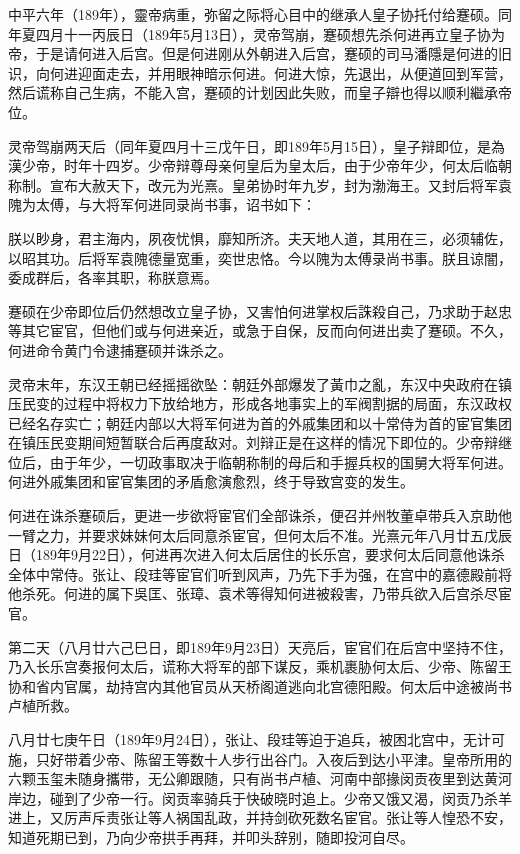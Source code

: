 中平六年（189年），靈帝病重，弥留之际将心目中的继承人皇子协托付给蹇硕。同年夏四月十一丙辰日（189年5月13日），灵帝驾崩，蹇硕想先杀何进再立皇子协为帝，于是请何进入后宫。但是何进刚从外朝进入后宫，蹇硕的司马潘隱是何进的旧识，向何进迎面走去，并用眼神暗示何进。何进大惊，先退出，从便道回到军营，然后谎称自己生病，不能入宫，蹇硕的计划因此失败，而皇子辯也得以顺利繼承帝位。

灵帝驾崩两天后（同年夏四月十三戊午日，即189年5月15日），皇子辩即位，是為漢少帝，时年十四岁。少帝辩尊母亲何皇后为皇太后，由于少帝年少，何太后临朝称制。宣布大赦天下，改元为光熹。皇弟协时年九岁，封为渤海王。又封后将军袁隗为太傅，与大将军何进同录尚书事，诏书如下：

朕以眇身，君主海内，夙夜忧惧，靡知所济。夫天地人道，其用在三，必须辅佐，以昭其功。后将军袁隗德量宽重，奕世忠恪。今以隗为太傅录尚书事。朕且谅闇，委成群后，各率其职，称朕意焉。

蹇硕在少帝即位后仍然想改立皇子协，又害怕何进掌权后誅殺自己，乃求助于赵忠等其它宦官，但他们或与何进亲近，或急于自保，反而向何进出卖了蹇硕。不久，何进命令黄门令逮捕蹇硕并诛杀之。

灵帝末年，东汉王朝已经摇摇欲坠：朝廷外部爆发了黃巾之亂，东汉中央政府在镇压民变的过程中将权力下放给地方，形成各地事实上的军阀割据的局面，东汉政权已经名存实亡；朝廷内部以大将军何进为首的外戚集团和以十常侍为首的宦官集团在镇压民变期间短暂联合后再度敌对。刘辩正是在这样的情况下即位的。少帝辩继位后，由于年少，一切政事取决于临朝称制的母后和手握兵权的国舅大将军何进。何进外戚集团和宦官集团的矛盾愈演愈烈，终于导致宫变的发生。

何进在诛杀蹇硕后，更进一步欲将宦官们全部诛杀，便召并州牧董卓带兵入京助他一臂之力，并要求妹妹何太后同意杀宦官，但何太后不准。光熹元年八月廿五戊辰日（189年9月22日），何进再次进入何太后居住的长乐宫，要求何太后同意他诛杀全体中常侍。张让、段珪等宦官们听到风声，乃先下手为强，在宫中的嘉德殿前将他杀死。何进的属下吳匡、张璋、袁术等得知何进被殺害，乃带兵欲入后宫杀尽宦官。

第二天（八月廿六己巳日，即189年9月23日）天亮后，宦官们在后宫中坚持不住，乃入长乐宫奏报何太后，谎称大将军的部下谋反，乘机裹胁何太后、少帝、陈留王协和省内官属，劫持宫内其他官员从天桥阁道逃向北宫德阳殿。何太后中途被尚书卢植所救。

八月廿七庚午日（189年9月24日），张让、段珪等迫于追兵，被困北宫中，无计可施，只好带着少帝、陈留王等数十人步行出谷门。入夜后到达小平津。皇帝所用的六颗玉玺未随身攜带，无公卿跟随，只有尚书卢植、河南中部掾闵贡夜里到达黄河岸边，碰到了少帝一行。闵贡率骑兵于快破晓时追上。少帝又饿又渴，闵贡乃杀羊进上，又厉声斥责张让等人祸国乱政，并持剑砍死数名宦官。张让等人惶恐不安，知道死期已到，乃向少帝拱手再拜，并叩头辞别，随即投河自尽。

